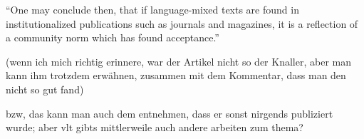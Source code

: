 ``One may conclude then, that if language-mixed
texts are found in institutionalized publications such as journals and magazines, it is a
reflection of a community norm which has found acceptance.''


(wenn ich mich richtig erinnere, war der Artikel nicht so der Knaller, aber man kann ihm trotzdem erwähnen, zusammen mit dem Kommentar, dass man den nicht so gut fand)

bzw, das kann man auch dem entnehmen, dass er sonst nirgends publiziert wurde;
aber vlt gibts mittlerweile auch andere arbeiten zum thema?


